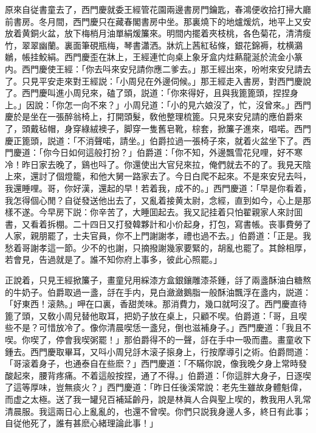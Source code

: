 原來自従書童去了，西門慶就委王經管花園兩邊書房門鑰匙，春鴻便收拾打掃大廳前書房。冬月間，西門慶只在藏春閣書房中坐。那裏燒下的地爐煖炕，地平上又安放着黄銅火盆，放下梅梢月油單絹煖簾來。明間内擺着夾枝桃，各色菊花，清清瘦竹，翠翠幽蘭。裏面筆硯瓶梅，琴書瀟洒。牀炕上茜紅毡條，銀花錦褥，枕横鸂鶒，帳挂鮫絹。西門慶歪在牀上，王經連忙向桌上象牙盒内炷爇龍涎於流金小篆内。西門慶使王經：「你去呌來安兒請你應二爹去。」那王經出來，吩咐來安兒請去了。只見平安走來對王經説：「小周兒在外邊伺候。」那王經走入書房，對西門慶說了。西門慶叫進小周兒來，磕了頭，説道：「你來得好，且與我篦篦頭，捏捏身上。」因說：「你怎一向不來？」小周兒道：「小的見六娘沒了，忙，沒曾來。」西門慶於是坐在一張醉翁椅上，打開頭髮，敎他整理梳篦。只見來安兒請的應伯爵來了，頭戴毡帽，身穿綠絨襖子，脚穿一隻舊皂靴，棕套，掀簾子進來，唱喏。西門慶正篦頭，説道：「不消聲喏，請坐。」伯爵拉過一張椅子來，就着火盆坐下了。西門慶道：「你今日如何這般打扮？」伯爵道：「你不知，外邊飄雪花兒哩，好不寒冷！昨日家去晚了，鷄也呌了。你還使出大官兒來拉，俺們就去不的了。我見天陰上來，還討了個燈籠，和他大舅一路家去了。今日白爬不起來。不是來安兒去呌，我還睡哩。哥，你好漢，還起的早！若着我，成不的。」西門慶道：「早是你看着，我怎得個心閒？自従發送他出去了，又亂着接黄太尉，念經，直到如今，心上是那樣不遂。今早房下説：你辛苦了，大睡囬起去。我又記挂着只怕翟親家人來討囬書，又看着拆棚。二十四日又打發韓夥計和小价起身，打包，寫書帳。丧事費勞了人家，親朋罷了，士夫官員，你不上門謝謝孝，禮也過不去。」伯爵道：「正是。我愁着哥謝孝這一節。少不的也謝，只摘撥謝幾家要緊的，胡亂也罷了。其餘相厚，若會見，告過就是了。誰不知你府上事多，彼此心照罷。」

正說着，只見王經掀簾子，畫童兒用綵漆方盒銀鑲雕漆茶鍾，㧱了兩盞酥油白糖熬的牛奶子。伯爵取過一盞，㧱在手内，見白瀲瀲鵝脂一般酥油飄浮在盞内，説道：「好東西！滚熱。」呷在口裏，香甜羙味。那消費力，幾口就呵沒了。西門慶直待篦了頭，又敎小周兒替他取耳，把奶子放在桌上，只顧不喫。伯爵道：「哥，且喫些不是？可惜放冷了。像你清晨喫恁一盞兒，倒也滋補身子。」西門慶道：「我且不喫。你喫了，停會我喫粥罷！」那伯爵得不的一聲，㧱在手中一吸而盡。畫童收下鍾去。西門慶取畢耳，又呌小周兒㧱木滚子㨰身上，行按摩導引之術。伯爵問道：「哥滚着身子，也通泰自在些麽？」西門慶道：「不瞞你說，像我晚夕身上常時發酸起來，腰背疼痛。不着這般按捏，通了不得。」伯爵道：「你這胖大身子，日逐喫了這等厚味，豈無痰火？」西門慶道：「昨日任後溪常說：老先生雖故身體魁偉，而虚之太極。送了我一罐兒百補延齡丹，說是林眞人合與聖上喫的，教我用人乳常清晨服。我這兩日心上亂亂的，也還不曾喫。你們只説我身邊人多，終日有此事；自従他死了，誰有甚麽心緒理論此事！」

